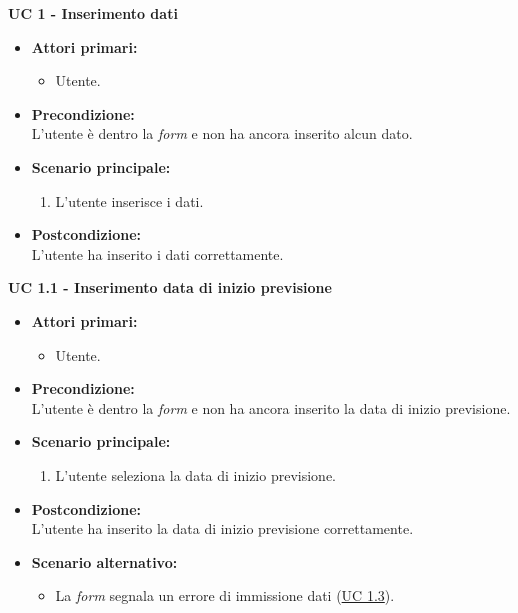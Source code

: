 \noindent \textbf{\large UC 1 - Inserimento dati}
\label{uc:inserimento-dati}
\begin{itemize}

	\item \textbf{Attori primari: }
		\begin{itemize}
			\item Utente.
		\end{itemize}

	\item \textbf{Precondizione: }\\[0.3cm]
		L'utente è dentro la \textit{form} e non ha ancora inserito alcun dato.

	\item \textbf{Scenario principale: }
		\begin{enumerate}
			\item L'utente inserisce i dati.
		\end{enumerate}
		

	\item \textbf{Postcondizione: }\\[0.3cm]
		L'utente ha inserito i dati correttamente.

\end{itemize}

\vspace{0.5cm}


\noindent \textbf{\large UC 1.1 - Inserimento data di inizio previsione}
\label{uc:inserimento-data-inizio-prev}
\begin{itemize}

	\item \textbf{Attori primari: }
		\begin{itemize}
			\item Utente.
		\end{itemize}

	\item \textbf{Precondizione: }\\[0.3cm]
		L'utente è dentro la \textit{form} e non ha ancora inserito la data di inizio previsione.

	\item \textbf{Scenario principale: }
		\begin{enumerate}
			\item L'utente seleziona la data di inizio previsione.
		\end{enumerate}

	\item \textbf{Postcondizione: }\\[0.3cm]
		L'utente ha inserito la data di inizio previsione correttamente.

	\item \textbf{Scenario alternativo: }
		\begin{itemize}
		    \item La \textit{form} segnala un errore di immissione dati (\hyperref[uc:err-inserimento-data-inizio-prev]{UC 1.3}).
		\end{itemize}

\end{itemize}

